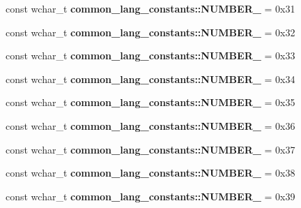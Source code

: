 \begin{DoxyCompactItemize}
\item 
\hypertarget{group___indexing_ga26cb9bd334885f19cba0afefc57109df}{const wchar\-\_\-t {\bfseries common\-\_\-lang\-\_\-constants\-::\-N\-U\-M\-B\-E\-R\-\_} = 0x31}\label{group___indexing_ga26cb9bd334885f19cba0afefc57109df}

\item 
\hypertarget{group___indexing_ga94919530331cebe6c34484421d044ac5}{const wchar\-\_\-t {\bfseries common\-\_\-lang\-\_\-constants\-::\-N\-U\-M\-B\-E\-R\-\_} = 0x32}\label{group___indexing_ga94919530331cebe6c34484421d044ac5}

\item 
\hypertarget{group___indexing_gabd88882b6c2513323b7cf8b48f223a77}{const wchar\-\_\-t {\bfseries common\-\_\-lang\-\_\-constants\-::\-N\-U\-M\-B\-E\-R\-\_} = 0x33}\label{group___indexing_gabd88882b6c2513323b7cf8b48f223a77}

\item 
\hypertarget{group___indexing_gaa8a633d55503e7f73e9dbbf9c376888b}{const wchar\-\_\-t {\bfseries common\-\_\-lang\-\_\-constants\-::\-N\-U\-M\-B\-E\-R\-\_} = 0x34}\label{group___indexing_gaa8a633d55503e7f73e9dbbf9c376888b}

\item 
\hypertarget{group___indexing_gaa3645eba391960dc96a45d2815bd1fb7}{const wchar\-\_\-t {\bfseries common\-\_\-lang\-\_\-constants\-::\-N\-U\-M\-B\-E\-R\-\_} = 0x35}\label{group___indexing_gaa3645eba391960dc96a45d2815bd1fb7}

\item 
\hypertarget{group___indexing_ga9840dc9b1683256d15aacbf969e26cc0}{const wchar\-\_\-t {\bfseries common\-\_\-lang\-\_\-constants\-::\-N\-U\-M\-B\-E\-R\-\_} = 0x36}\label{group___indexing_ga9840dc9b1683256d15aacbf969e26cc0}

\item 
\hypertarget{group___indexing_ga5ad44f1f3e6083f33b41e9309ef10a5c}{const wchar\-\_\-t {\bfseries common\-\_\-lang\-\_\-constants\-::\-N\-U\-M\-B\-E\-R\-\_} = 0x37}\label{group___indexing_ga5ad44f1f3e6083f33b41e9309ef10a5c}

\item 
\hypertarget{group___indexing_gaeb3435812810644b35c7e3dadf16818b}{const wchar\-\_\-t {\bfseries common\-\_\-lang\-\_\-constants\-::\-N\-U\-M\-B\-E\-R\-\_} = 0x38}\label{group___indexing_gaeb3435812810644b35c7e3dadf16818b}

\item 
\hypertarget{group___indexing_gacb94fe62894cfcfaadfbe898b1a5afb1}{const wchar\-\_\-t {\bfseries common\-\_\-lang\-\_\-constants\-::\-N\-U\-M\-B\-E\-R\-\_} = 0x39}\label{group___indexing_gacb94fe62894cfcfaadfbe898b1a5afb1}


\end{DoxyCompactItemize}
